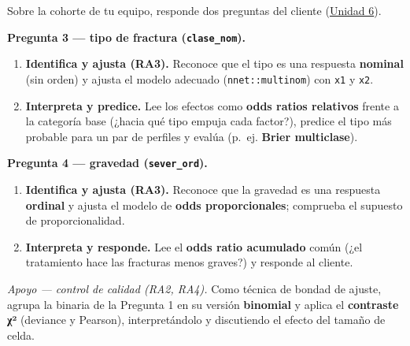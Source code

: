 \documentclass[
  letterpaper,
  DIV=11,
  numbers=noendperiod]{scrartcl}
\providecommand{\tightlist}{%
  \setlength{\itemsep}{0pt}\setlength{\parskip}{0pt}}\usepackage{longtable,booktabs,array}
\begin{document}
\begin{tcolorbox}[enhanced jigsaw, breakable, colframe=quarto-callout-important-color-frame, left=2mm, arc=.35mm, colbacktitle=quarto-callout-important-color!10!white, toprule=.15mm, colback=white, coltitle=black, rightrule=.15mm, opacitybacktitle=0.6, title=\textcolor{quarto-callout-important-color}{\faExclamation}\hspace{0.5em}{Tarea del estudiante (1.3) --- resuelve las Preguntas 3 y 4 del caso}, titlerule=0mm, toptitle=1mm, bottomtitle=1mm, leftrule=.75mm, bottomrule=.15mm, opacityback=0]

Sobre la cohorte de tu equipo, responde dos preguntas del cliente
(\protect\hyperlink{sec-u16}{Unidad 6}).

\textbf{Pregunta 3 --- tipo de fractura (\texttt{clase\_nom}).}

\begin{enumerate}
\def\labelenumi{\arabic{enumi}.}
\tightlist
\item
  \textbf{Identifica y ajusta (RA3).} Reconoce que el tipo es una
  respuesta \textbf{nominal} (sin orden) y ajusta el modelo adecuado
  (\texttt{nnet::multinom}) con \texttt{x1} y \texttt{x2}.
\item
  \textbf{Interpreta y predice.} Lee los efectos como \textbf{odds
  ratios relativos} frente a la categoría base (¿hacia qué tipo empuja
  cada factor?), predice el tipo más probable para un par de perfiles y
  evalúa (p.~ej. \textbf{Brier multiclase}).
\end{enumerate}

\textbf{Pregunta 4 --- gravedad (\texttt{sever\_ord}).}

\begin{enumerate}
\def\labelenumi{\arabic{enumi}.}
\setcounter{enumi}{2}
\tightlist
\item
  \textbf{Identifica y ajusta (RA3).} Reconoce que la gravedad es una
  respuesta \textbf{ordinal} y ajusta el modelo de \textbf{odds
  proporcionales}; comprueba el supuesto de proporcionalidad.
\item
  \textbf{Interpreta y responde.} Lee el \textbf{odds ratio acumulado}
  común (¿el tratamiento hace las fracturas menos graves?) y responde al
  cliente.
\end{enumerate}

\emph{Apoyo --- control de calidad (RA2, RA4).} Como técnica de bondad
de ajuste, agrupa la binaria de la Pregunta 1 en su versión
\textbf{binomial} y aplica el \textbf{contraste χ²} (deviance y
Pearson), interpretándolo y discutiendo el efecto del tamaño de celda.

\end{tcolorbox}
\end{document}
